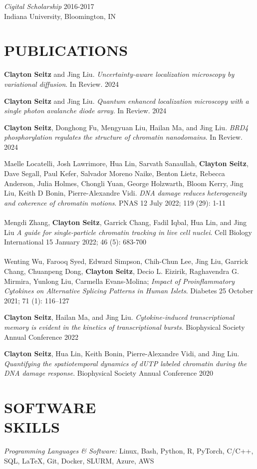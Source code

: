 \documentclass[margin, 10pt]{res} %
\begin{document}
\begin{resume}
{\sl Cigital Scholarship} \hfill 2016-2017 \\
Indiana University, Bloomington, IN 

\section{PUBLICATIONS}

\textbf{Clayton Seitz} and Jing Liu. \textit{Uncertainty-aware localization microscopy by variational diffusion}. In Review. 2024

\textbf{Clayton Seitz} and Jing Liu. \textit{Quantum enhanced localization microscopy with a single photon avalanche diode array}. In Review. 2024

\textbf{Clayton Seitz}\textsuperscript{\textdagger}, Donghong Fu\textsuperscript{\textdagger}, Mengyuan Liu, Hailan Ma, and Jing Liu. \textit{BRD4 phosphorylation regulates the structure of chromatin nanodomains}. In Review. 2024

Maelle Locatelli\textsuperscript{\textdagger}, Josh Lawrimore\textsuperscript{\textdagger}, Hua Lin\textsuperscript{\textdagger}, Sarvath Sanaullah, \textbf{Clayton Seitz}, Dave Segall, Paul Kefer, Salvador Moreno Naike, Benton Lietz, Rebecca Anderson, Julia Holmes, Chongli Yuan, George Holzwarth, Bloom Kerry, Jing Liu, Keith D Bonin, Pierre-Alexandre Vidi. \textit{DNA damage reduces heterogeneity and coherence of chromatin motions}. PNAS 12 July 2022; 119 (29): 1-11
\\
\\
Mengdi Zhang, \textbf{Clayton Seitz}, Garrick Chang, Fadil Iqbal, Hua Lin, and Jing Liu \textit{A guide for single-particle chromatin tracking in live cell nuclei}. Cell Biology International 15 January 2022; 46 (5): 683-700
\\
\\
Wenting Wu, Farooq Syed, Edward Simpson, Chih-Chun Lee, Jing Liu, Garrick Chang, Chuanpeng Dong, \textbf{Clayton Seitz}, Decio L. Eizirik, Raghavendra G. Mirmira, Yunlong Liu, Carmella Evans-Molina; \textit{Impact of Proinflammatory Cytokines on Alternative Splicing Patterns in Human Islets}. Diabetes 25 October 2021; 71 (1): 116–127

\textbf{Clayton Seitz}, Hailan Ma, and Jing Liu. \textit{Cytokine-induced transcriptional memory is evident in the kinetics of transcriptional bursts}. Biophysical Society Annual Conference 2022


\textbf{Clayton Seitz}, Hua Lin, Keith Bonin, Pierre-Alexandre Vidi, and Jing Liu. \textit{Quantifying the spatiotemporal dynamics of dUTP labeled chromatin during the DNA damage response}. Biophysical Society Annual Conference 2020


\section{SOFTWARE \\ SKILLS} 

{\sl Programming Languages \& Software:} 
Linux, Bash, Python, R, PyTorch, C/C++, SQL, LaTeX, Git, Docker, SLURM, Azure, AWS\\

\end{resume}
\end{document}
